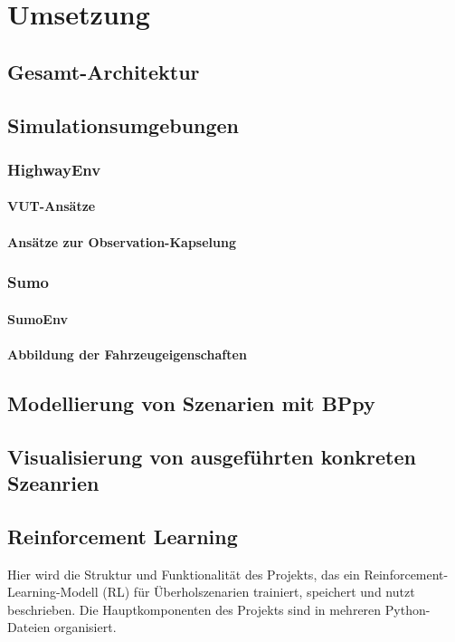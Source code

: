 \chapter{Umsetzung}

\section{Gesamt-Architektur}
\section{Simulationsumgebungen}
\subsection{HighwayEnv}
\subsubsection{VUT-Ansätze}
\subsubsection{Ansätze zur Observation-Kapselung}
\subsection{Sumo}
\subsubsection{SumoEnv}
\subsubsection{Abbildung der Fahrzeugeigenschaften}
\section{Modellierung von Szenarien mit BPpy}
\section{Visualisierung von ausgeführten konkreten Szeanrien}
\section{Reinforcement Learning}
Hier wird die Struktur und Funktionalität des Projekts, das ein Reinforcement-Learning-Modell (RL) für Überholszenarien trainiert, speichert und nutzt beschrieben. Die Hauptkomponenten des Projekts sind in mehreren Python-Dateien organisiert.

